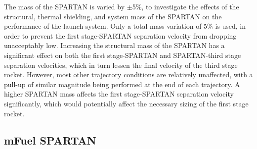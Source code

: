 The mass of the SPARTAN is varied by $\pm$5\%, to investigate the effects of the structural, thermal shielding, and system mass of the SPARTAN on the performance of the launch system. Only a total mass variation of 5\% is used, in order to prevent the first stage-SPARTAN separation velocity from dropping unacceptably low. Increasing the structural mass of the SPARTAN has a significant effect on both the first stage-SPARTAN and SPARTAN-third stage separation velocities, which in turn lessen the final velocity of the third stage rocket. However, most other trajectory conditions are relatively unaffected, with a pull-up of similar magnitude being performed at the end of each trajectory. 
A higher SPARTAN mass affects the first stage-SPARTAN separation velocity significantly, which would potentially affect the necessary sizing of the first stage rocket. 


\subsection{mFuel SPARTAN}


